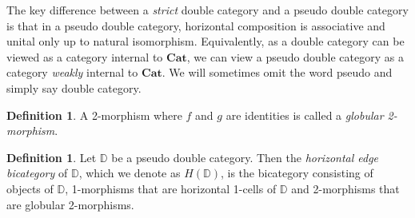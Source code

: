 \documentclass[11pt]{amsart}
\newcommand{\cat}[1]{\mathbf{#1}}
\newcommand{\dblcat}[1]{\mathbb{#1}}
\theoremstyle{remark}
\theoremstyle{definition}
\newtheorem{defn}[thm]{Definition}
\begin{document}
The key difference between a \emph{strict} double category and a pseudo double category is that in a pseudo double category, horizontal composition is associative and unital only up to natural isomorphism. Equivalently, as a double category can be viewed as a category internal to $\cat{Cat}$, we can view a pseudo double category as a category \emph{weakly} internal to $\cat{Cat}$. We will sometimes omit the word pseudo and simply say double category.

\begin{defn}
	A 2-morphism where $f$ and $g$ are identities is called a \emph{globular 2-morphism}.
\end{defn}

\begin{defn}
	Let $\dblcat{D}$ be a pseudo double category. Then the \emph{horizontal edge bicategory} of $\dblcat{D}$, which we denote as $H(\dblcat{D})$, is the bicategory consisting of objects of $\dblcat{D}$, 1-morphisms that are horizontal 1-cells of $\dblcat{D}$ and 2-morphisms that are globular 2-morphisms.
\end{defn}
\end{document}
